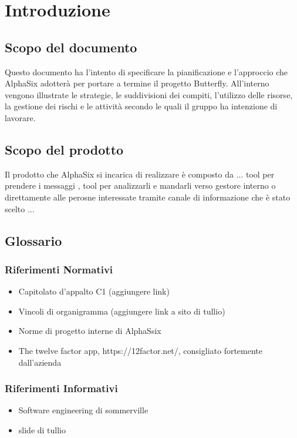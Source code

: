 \newpage
\section{Introduzione} \label{Introduzione}
	
	\subsection{Scopo del documento}
	Questo documento ha l'intento di specificare la pianificazione e l'approccio che AlphaSix adotterà per portare a termine il progetto Butterfly.
	All'interno vengono illustrate le strategie, le suddivisioni dei compiti, l'utilizzo delle risorse, la gestione dei rischi e le attività secondo le quali il gruppo ha intenzione di lavorare.
	
	\subsection{Scopo del prodotto}	
	Il prodotto che AlphaSix si incarica di realizzare è composto da ... tool per prendere i messaggi , tool per analizzarli e mandarli verso gestore interno o direttamente alle perosne interessate tramite canale di informazione che è stato scelto ...
	
	\subsection{Glossario}
		\subsubsection{Riferimenti Normativi}
			\begin{itemize}
				\item Capitolato d'appalto C1 (aggiungere link)
				\item Vincoli di organigramma (aggiungere link a sito di tullio)
				\item Norme di progetto interne di AlphaSsix 
				\item The twelve factor app, https://12factor.net/, consigliato fortemente dall'azienda
			\end{itemize}
		
		\subsubsection{Riferimenti Informativi}
			\begin{itemize}
				\item Software engineering di sommerville
				\item slide di tullio
			\end{itemize}
		
